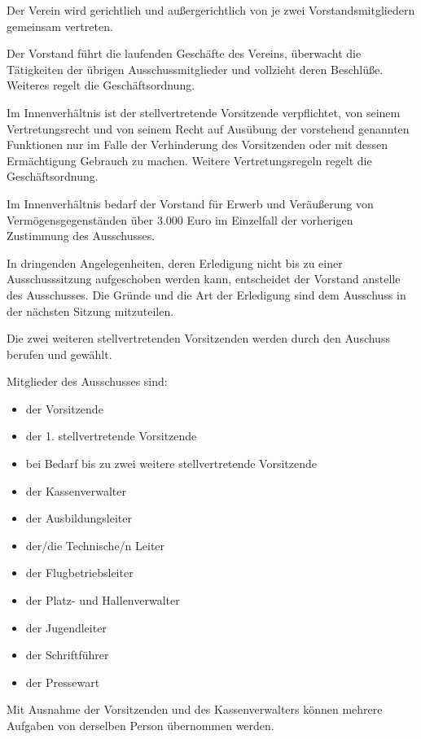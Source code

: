 \documentclass[10pt,a4paper,parskip=half]{scrartcl}
\begin{document}
\begin{contract}
    Der Verein wird gerichtlich und außergerichtlich von je zwei Vorstandsmitgliedern gemeinsam vertreten.
    
    Der Vorstand führt die laufenden Geschäfte des Vereins, überwacht die Tätigkeiten der übrigen Ausschussmitglieder und vollzieht deren Beschlüße. Weiteres regelt die Geschäftsordnung.
    
    Im Innenverhältnis ist der stellvertretende Vorsitzende verpflichtet,
    von seinem Vertretungsrecht und von seinem Recht auf Ausübung der vorstehend genannten Funktionen nur im Falle der Verhinderung des Vorsitzenden oder mit dessen Ermächtigung Gebrauch zu machen. Weitere Vertretungsregeln regelt die Geschäftsordnung.
    
    Im Innenverhältnis bedarf der Vorstand für Erwerb und Veräußerung von Vermögensgegenständen über 3.000 Euro im Einzelfall der vorherigen Zustimmung des Ausschusses.
    
    In dringenden Angelegenheiten,
    deren Erledigung nicht bis zu einer Ausschusssitzung aufgeschoben werden kann,
    entscheidet der Vorstand anstelle des Ausschusses.
    Die Gründe und die Art der Erledigung sind dem Ausschuss in der nächsten Sitzung mitzuteilen.

    Die zwei weiteren stellvertretenden Vorsitzenden werden durch den Auschuss berufen und gewählt.
    
    \label{C:Ausschuss}
    Mitglieder des Ausschusses sind:
    \begin{itemize}[noitemsep]
      \item der Vorsitzende
      \item der 1. stellvertretende Vorsitzende
      \item bei Bedarf bis zu zwei weitere stellvertretende Vorsitzende
      \item der Kassenverwalter
      \item der Ausbildungsleiter
      \item der/die Technische/n Leiter
      \item der Flugbetriebsleiter
      \item der Platz- und Hallenverwalter
      \item der Jugendleiter
      \item der Schriftführer
      \item der Pressewart
    \end{itemize}
    Mit Ausnahme der Vorsitzenden und des Kassenverwalters können mehrere Aufgaben von derselben Person übernommen werden.
    

\end{contract}
\end{document}
